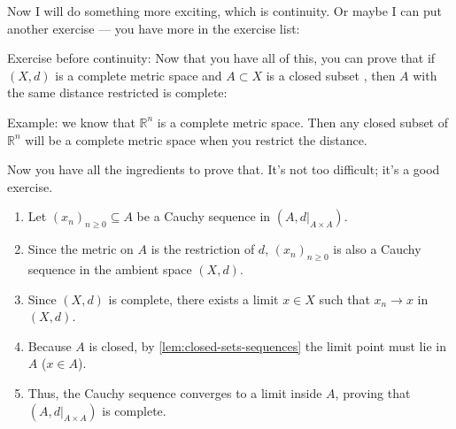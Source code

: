 \begin{speech}[00:55:23 - 00:56:54]
Now I will do something more exciting, which is continuity. Or maybe I can put another exercise --- you have more in the exercise list: 

Exercise before continuity: Now that you have all of this, you can prove that if $(X, d)$ is a complete metric space  and $A \subset X$ is a closed subset , then $A$ with the same distance restricted is complete: 

Example: we know that $\mathbb{R}^n$ is a complete metric space. Then any closed subset of $\mathbb{R}^n$ will be a complete metric space when you restrict the distance.

Now you have all the ingredients to prove that. It's not too difficult; it's a good exercise.
\end{speech}

\begin{content}


\begin{steps}
\begin{enumerate}[label=\textbf{(\arabic*)}]
    \item Let $(x_n)_{n \ge 0} \subseteq A$ be a Cauchy sequence in $(A, d|_{A \times A})$.
    \item Since the metric on $A$ is the restriction of $d$, $(x_n)_{n \ge 0}$ is also a Cauchy sequence in the ambient space $(X, d)$.
    \item Since $(X, d)$ is complete, there exists a limit $x \in X$ such that $x_n \to x$ in $(X, d)$.
    \item Because $A$ is closed, by \cref{lem:closed-sets-sequences} the limit point must lie in $A$ ($x \in A$).
    \item Thus, the Cauchy sequence converges to a limit inside $A$, proving that $(A, d|_{A \times A})$ is complete.
\end{enumerate}
\end{steps}
\end{content}

